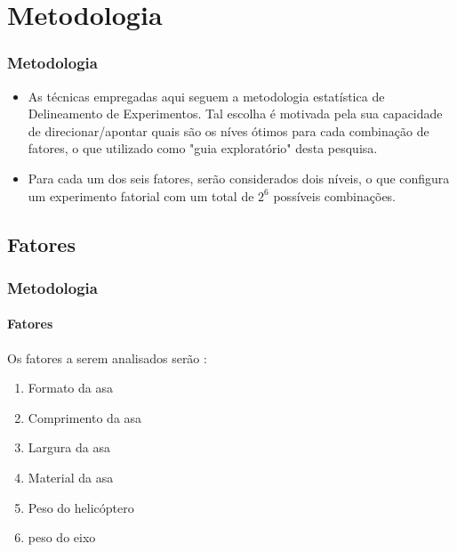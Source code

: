 \documentclass{beamer}
\begin{document}
\section{Metodologia}
    \begin{frame}
        \frametitle{Metodologia}

        \begin{itemize}
            \item As técnicas empregadas aqui seguem a metodologia estatística de Delineamento de Experimentos. Tal escolha é motivada pela sua capacidade de direcionar/apontar quais são os níves ótimos para cada combinação de fatores, o que utilizado como "guia exploratório" desta pesquisa.

            \item Para cada um dos seis fatores, serão considerados dois níveis, o que configura um experimento fatorial com um total de $2^6$ possíveis combinações.

        \end{itemize}
    \end{frame}

    \subsection{Fatores}
        \begin{frame}
            \frametitle{Metodologia}
                \framesubtitle{Fatores}
                    Os fatores a serem analisados serão :

                        \begin{enumerate}
                            \item Formato da asa
                            \item Comprimento da asa
                            \item Largura da asa
                            \item Material da asa
                            \item Peso do helicóptero
                            \item peso do eixo
                        \end{enumerate}

        \end{frame}
\end{document}
